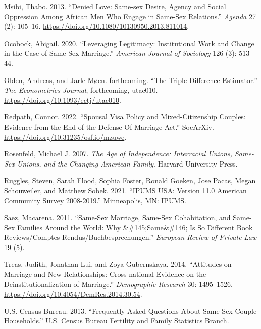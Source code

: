 \documentclass[
  12pt,
]{article}
\newlength{\cslhangindent}
\newlength{\cslentryspacingunit} %
\newenvironment{CSLReferences}[2] %
 {%
  \setlength{\parindent}{0pt}
  \ifodd #1
  \let\oldpar\par
  \def\par{\hangindent=\cslhangindent\oldpar}
  \fi
  \setlength{\parskip}{#2\cslentryspacingunit}
 }%
 {}
\begin{document}
\begin{CSLReferences}{1}{0}
\leavevmode{}%
Msibi, Thabo. 2013. {``Denied Love: {Same-sex} Desire, Agency and Social Oppression Among {African} Men Who Engage in Same-Sex Relations.''} \emph{Agenda} 27 (2): 105--16. \url{https://doi.org/10.1080/10130950.2013.811014}.

\leavevmode{}%
Ocobock, Abigail. 2020. {``Leveraging {Legitimacy}: {Institutional Work} and {Change} in the {Case} of {Same-Sex Marriage}.''} \emph{American Journal of Sociology} 126 (3): 513--44.

\leavevmode{}%
Olden, Andreas, and Jarle Møen. forthcoming. {``The Triple Difference Estimator.''} \emph{The Econometrics Journal}, forthcoming, utac010. \url{https://doi.org/10.1093/ectj/utac010}.

\leavevmode{}%
Redpath, Connor. 2022. {``Spousal {Visa Policy} and {Mixed-Citizenship Couples}: {Evidence} from the {End} of the {Defense Of Marriage Act}.''} {SocArXiv}. \url{https://doi.org/10.31235/osf.io/mzuwe}.

\leavevmode{}%
Rosenfeld, Michael J. 2007. \emph{The {Age} of {Independence}: {Interracial Unions}, {Same-Sex Unions}, and the {Changing American Family}}. {Harvard University Press}.

\leavevmode{}%
Ruggles, Steven, Sarah Flood, Sophia Foster, Ronald Goeken, Jose Pacas, Megan Schouweiler, and Matthew Sobek. 2021. {``{IPUMS USA}: {Version} 11.0 {American Community Survey} 2008-2019.''} {Minneapolis, MN}: {IPUMS}.

\leavevmode{}%
Saez, Macarena. 2011. {``Same-{Sex Marriage}, {Same-Sex Cohabitation}, and {Same-Sex Families} Around the {World}: {Why} \&\#145;{Same}\&\#146; {Is So Different Book} Reviews/{Comptes} Rendus/{Buchbesprechungen}.''} \emph{European Review of Private Law} 19 (5).

\leavevmode{}%
Treas, Judith, Jonathan Lui, and Zoya Gubernskaya. 2014. {``Attitudes on Marriage and New Relationships: {Cross-national} Evidence on the Deinstitutionalization of Marriage.''} \emph{Demographic Research} 30: 1495--1526. \url{https://doi.org/10.4054/DemRes.2014.30.54}.

\leavevmode{}%
U.S. Census Bureau. 2013. {``Frequently {Asked Questions About Same-Sex Couple Households}.''} {U.S. Census Bureau Fertility and Family Statistics Branch}.


\end{CSLReferences}
\end{document}
